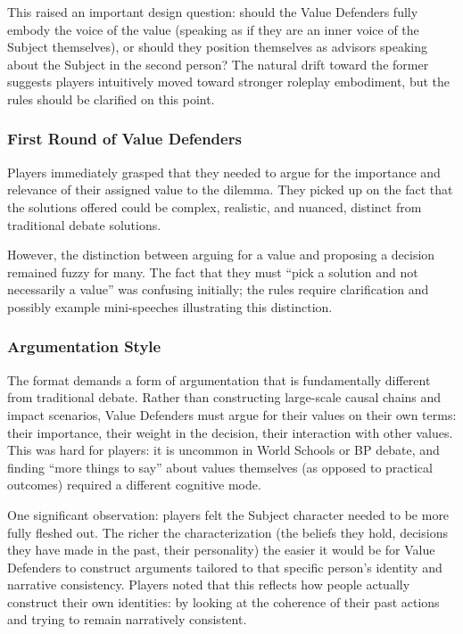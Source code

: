 \documentclass[12pt]{article}
\begin{document}
This raised an important design question: should the Value Defenders fully embody the voice of the value (speaking as if they are an inner voice of the Subject themselves), or should they position themselves as advisors speaking about the Subject in the second person? The natural drift toward the former suggests players intuitively moved toward stronger roleplay embodiment, but the rules should be clarified on this point.

\subsubsection{First Round of Value Defenders}

Players immediately grasped that they needed to argue for the importance and relevance of their assigned value to the dilemma. They picked up on the fact that the solutions offered could be complex, realistic, and nuanced, distinct from traditional debate solutions.

However, the distinction between arguing for a value and proposing a decision remained fuzzy for many. The fact that they must ``pick a solution and not necessarily a value'' was confusing initially; the rules require clarification and possibly example mini-speeches illustrating this distinction.

\subsubsection{Argumentation Style}

The format demands a form of argumentation that is fundamentally different from traditional debate. Rather than constructing large-scale causal chains and impact scenarios, Value Defenders must argue for their values on their own terms: their importance, their weight in the decision, their interaction with other values. This was hard for players: it is uncommon in World Schools or BP debate, and finding ``more things to say'' about values themselves (as opposed to practical outcomes) required a different cognitive mode.

One significant observation: players felt the Subject character needed to be more fully fleshed out. The richer the characterization (the beliefs they hold, decisions they have made in the past, their personality) the easier it would be for Value Defenders to construct arguments tailored to that specific person's identity and narrative consistency. Players noted that this reflects how people actually construct their own identities: by looking at the coherence of their past actions and trying to remain narratively consistent.
\end{document}
